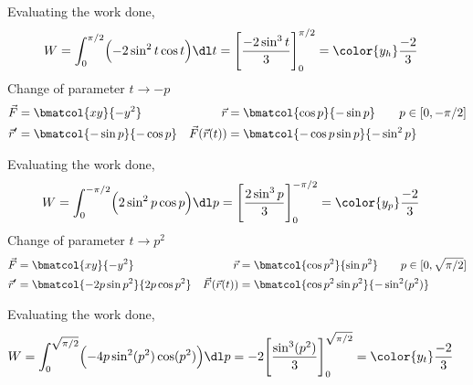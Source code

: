 \begin{enumerate}
\begin{enumerate}
                    Evaluating the work done,
                    \begin{align}
                        W & = \int_{0}^{\pi/2} \Bigl( -2\sin^2 t \cos t \Bigr) \dl t
                        = \Bigg[ \frac{-2\sin^3 t}{3} \Bigg]_0^{\pi/2}
                        = \color{y_h} \frac{-2}{3}
                    \end{align}
                    Change of parameter $ t \to -p $
                    \begin{align}
                        \vec{F}             & = \bmatcol{xy}{-y^2}                  &
                        \vec{r}             & =
                        \bmatcol{\cos p}{-\sin p} \qquad p \in [0, -\pi/2]            \\
                        \vec{r}'            & = \bmatcol{-\sin p}{-\cos p}          &
                        \vec{F}(\vec{r}(t)) & = \bmatcol{-\cos p \sin p}{-\sin^2 p}
                    \end{align}

                    Evaluating the work done,
                    \begin{align}
                        W & = \int_{0}^{-\pi/2} \Bigl( 2\sin^2 p \cos p \Bigr) \dl p
                        = \Bigg[ \frac{2\sin^3 p}{3} \Bigg]_0^{-\pi/2}
                        = \color{y_p} \frac{-2}{3}
                    \end{align}
                    Change of parameter $ t \to p^2 $
                    \begin{align}
                        \vec{F}             & = \bmatcol{xy}{-y^2}                &
                        \vec{r}             & =
                        \bmatcol{\cos p^2}{\sin p^2} \qquad p \in [0, \sqrt{\pi/2}] \\
                        \vec{r}'            & = \bmatcol{-2p\sin p^2}{2p\cos p^2} &
                        \vec{F}(\vec{r}(t)) & = \bmatcol{\cos p^2 \sin p^2}
                        {-\sin^2 (p^2)}
                    \end{align}

                    Evaluating the work done,
                    \begin{align}
                        W & = \int_{0}^{\sqrt{\pi/2}} \Bigl( -4p\sin^2(p^2) \cos(p^2)
                        \Bigr) \dl p = -2 \Bigg[ \frac{\sin^3 (p^2)}{3}
                            \Bigg]_0^{\sqrt{\pi/2}} = \color{y_t} \frac{-2}{3}
                    \end{align}


\end{enumerate}
\end{enumerate}
